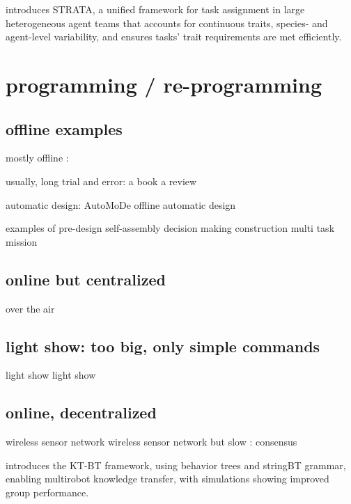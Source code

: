 \cite{ravichandar2020strata} introduces STRATA, a unified framework for task assignment in large heterogeneous agent teams that accounts for continuous traits, species- and agent-level variability, and ensures tasks' trait requirements are met efficiently.

\section{programming / re-programming}

\subsection {offline examples}

mostly offline :

usually, long trial and error: 
\cite{hamann2018swarm} a book
\cite{brambilla2013swarm} a review

automatic design:
\cite{francesca2014automode} AutoMoDe
\cite{francesca2016automatic}
\cite{birattari2019automatic} offline automatic design

examples of pre-design
\cite{rubenstein2014programmable} self-assembly
\cite{valentini2016collective} decision making
\cite{werfel2014designing} construction
\cite{dorigo2013swarmanoid} multi task mission

\subsection {online but centralized}
\cite{zyrianoff2024over} over the air
\cite{abadie2024robotap}

\subsection {light show: too big, only simple commands}
\cite{waibel2017drone} light show
\cite{ang2018high} light show

\subsection {online, decentralized}
\cite{xie2011design} wireless sensor network
\cite{wang2006reprogramming} wireless sensor network
but slow : consensus
\cite{de2009energy}
\cite{varadharajan2018over} 



\cite{venkata2023kt} introduces the KT-BT framework, using behavior trees and stringBT grammar, enabling multirobot knowledge transfer, with simulations showing improved group performance.


